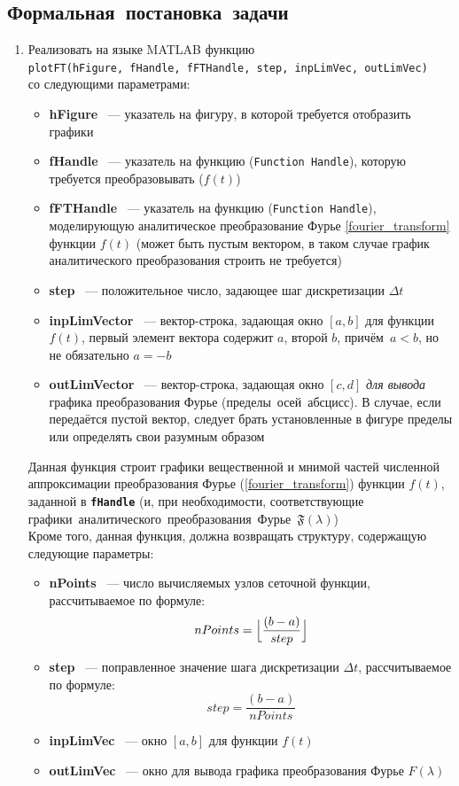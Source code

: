 \documentclass[11pt, oneside, final]{article} \sloppy
\numberwithin{equation}{section}
\newcommand \bitem[1][]{
\item \textbf{#1}}
\newcommand \four[1][\lambda]{\mathfrak{F}(#1)}
\newcommand \fft[1][\lambda]{F(#1)}
\begin{document}
\subsection{Формальная~постановка~задачи} 
\begin{enumerate}
    \item Реализовать на языке MATLAB функцию \\\texttt{plotFT(hFigure,~fHandle,~fFTHandle,~step,~inpLimVec,~outLimVec)} \\со следующими параметрами: 
    \begin{itemize}
        \bitem[hFigure] ~--- указатель на фигуру, в которой требуется отобразить графики \bitem[fHandle] ~--- указатель на функцию (\texttt{Function Handle}), которую требуется преобразовывать (\(f(t)\)) \bitem[fFTHandle] ~--- указатель на функцию (\texttt{Function Handle}), моделирующую аналитическое преобразование Фурье \eqref{fourier_transform} функции \(f(t)\) (может быть пустым вектором, в таком случае график аналитического преобразования строить не требуется) \bitem[step] ~--- положительное число, задающее шаг дискретизации \(\Delta t\) \bitem[inpLimVector] ~--- вектор-строка, задающая окно \([a, b]\) для функции \(f(t)\), первый элемент вектора содержит \(a\), второй \(b\), причём~\(a < b\), но не обязательно \(a = -b\) \bitem[outLimVector] ~--- вектор-строка, задающая окно \([c, d]\) \textit{для вывода} графика преобразования Фурье (пределы~осей~абсцисс). В случае, если передаётся пустой вектор, следует брать установленные в фигуре пределы или определять свои разумным образом 
    \end{itemize}
    Данная функция строит графики вещественной и мнимой частей численной аппроксимации преобразования Фурье (\ref{fourier_transform}) функции \(f(t)\), заданной в \textbf{\texttt{fHandle}} (и, при необходимости, соответствующие графики~аналитического~преобразования~Фурье~\(\four\)) \\
    Кроме того, данная функция, должна возвращать структуру, содержащую следующие параметры: 
    \begin{itemize}
        \bitem[nPoints] ~--- число вычисляемых узлов сеточной функции, рассчитываемое по формуле:
        \[ nPoints = \Bigl\lfloor {\dfrac{(b - a)}{step}}\Bigr\rfloor \]
        \bitem[step] ~--- поправленное значение шага дискретизации \(\Delta t\), рассчитываемое по формуле:
        \[step= \dfrac{(b - a)}{nPoints}\]
        \bitem[inpLimVec] ~--- окно \([a, b]\) для функции \(f(t)\) \bitem[outLimVec] ~--- окно для вывода графика преобразования Фурье \(\fft\) 
    \end{itemize}

\end{enumerate}
\end{document}
